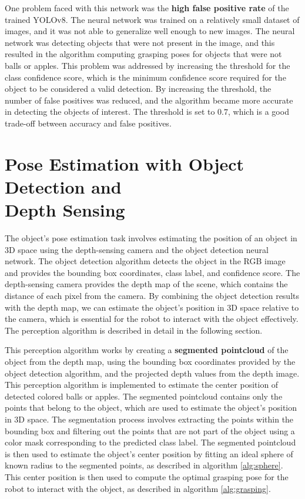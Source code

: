 One problem faced with this network was the \textbf{high false positive rate} of the trained YOLOv8.
The neural network was trained on a relatively small dataset of images, and it was not able
to generalize well enough to new images. The neural network was detecting objects that were not present in the image,
and this resulted in the algorithm computing grasping poses for objects that were not balls or apples.
This problem was addressed by increasing the threshold for the class confidence score, which is the minimum
confidence score required for the object to be considered a valid detection. By increasing the threshold,
the number of false positives was reduced, and the algorithm became more accurate in detecting the objects
of interest. The threshold is set to $0.7$, which is a good trade-off between accuracy and false positives.

\section{Pose Estimation with Object Detection and \\ Depth Sensing}

The object's pose estimation task involves estimating the position of an object in 3D space using the depth-sensing
camera and the object detection neural network. The object detection algorithm detects the object 
in the RGB image and provides the bounding box coordinates, class label, and confidence score. 
The depth-sensing camera provides the depth map of the scene, which contains the distance of each pixel from the camera.
By combining the object detection results with the depth map, we can estimate the object's position in 3D space
relative to the camera, which is essential for the robot to interact with the object effectively.
The perception algorithm is described in detail in the following section.

This perception algorithm works by creating a \textbf{segmented pointcloud} of the object from the depth map,
using the bounding box coordinates provided by the object detection algorithm, and the projected depth values
from the depth image. This perception algorithm is implemented to estimate the center position
of detected colored balls or apples.
The segmented pointcloud contains only the points that belong to the object, which are used
to estimate the object's position in 3D space. The segmentation process involves extracting the points within
the bounding box and filtering out the points that are not part of the object using a color mask corresponding
to the predicted class label. The segmented pointcloud is then used to estimate the object's center position
by fitting an ideal sphere of known radius to the segmented points, as described in algorithm \ref{alg:sphere}.
This center position is then used to compute the optimal grasping pose for the robot to interact with the object,
as described in algorithm \ref{alg:grasping}.

